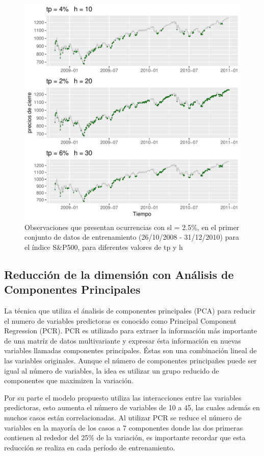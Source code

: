 \documentclass[a4paper,12pt]{Latex/Classes/PhDthesisPSnPDF}
\begin{document}
\begin{figure}[H]
\centering
\includegraphics{main-006}
\caption{Observaciones que presentan ocurrencias con sl = 2.5\%, en el primer conjunto de datos de entrenamiento (26/10/2008 - 31/12/2010) para el índice S\&P500, para diferentes valores de tp y h}
\end{figure}

\subsection{Reducción de la dimensión con Análisis de Componentes Principales}

La técnica que utiliza el ánalisis de componentes principales (PCA) para reducir el numero de variables predictoras es conocido como Principal Component Regression (PCR). PCR es utilizado para extraer la información más importante de una matríz de datos multivariante y expresar ésta información en nuevas variables llamadas componentes principales. Éstas son una combinación lineal de las variables originales. Aunque el número de componentes principañes puede ser igual al número de variables, la idea es utilizar un grupo reducido de componentes que maximizen la variación.

Por su parte el modelo propuesto utiliza las interacciones entre las variables predictoras, esto aumenta el número de variables de 10 a 45, las cuales además en muchos casos están correlacionadas. Al utilizar PCR se reduce el número de variables en la mayoría de los casos a 7 componentes donde las dos primeras contienen al rededor del 25\% de la variación, es importante recordar que esta reducción se realiza en cada período de entrenamiento. 
\end{document}
